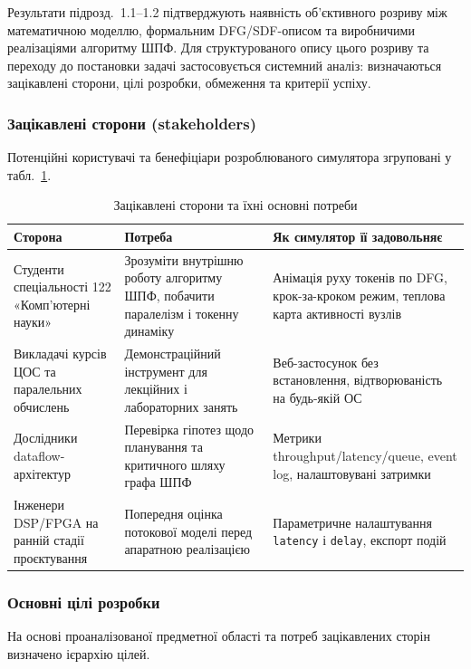 Результати підрозд.~1.1--1.2 підтверджують наявність об'єктивного
розриву між математичною моделлю, формальним DFG/SDF-описом та
виробничими реалізаціями алгоритму ШПФ. Для структурованого опису
цього розриву та переходу до постановки задачі застосовується
системний аналіз: визначаються зацікавлені сторони, цілі розробки,
обмеження та критерії успіху.

\subsubsection*{Зацікавлені сторони (stakeholders)}

Потенційні користувачі та бенефіціари розроблюваного симулятора
згруповані у табл.~\ref{tab:stakeholders}.

\begin{table}[H]
  \caption{Зацікавлені сторони та їхні основні потреби}
  \label{tab:stakeholders}
  \centering
  \small
  \begin{tabular}{p{3.4cm}p{5.0cm}p{5.0cm}}
    \toprule
    Сторона & Потреба & Як симулятор її задовольняє \\
    \midrule
    Студенти спеціальності 122 «Комп'ютерні науки» & Зрозуміти внутрішню роботу алгоритму ШПФ, побачити паралелізм і токенну динаміку & Анімація руху токенів по DFG, крок-за-кроком режим, теплова карта активності вузлів \\[2pt]
    Викладачі курсів ЦОС та паралельних обчислень & Демонстраційний інструмент для лекційних і лабораторних занять & Веб-застосунок без встановлення, відтворюваність на будь-якій ОС \\[2pt]
    Дослідники dataflow-архітектур & Перевірка гіпотез щодо планування та критичного шляху графа ШПФ & Метрики throughput/latency/queue, event log, налаштовувані затримки \\[2pt]
    Інженери DSP/FPGA на ранній стадії проєктування & Попередня оцінка потокової моделі перед апаратною реалізацією & Параметричне налаштування \texttt{latency} і \texttt{delay}, експорт подій \\
    \bottomrule
  \end{tabular}
\end{table}

\subsubsection*{Основні цілі розробки}

На основі проаналізованої предметної області та потреб
зацікавлених сторін визначено ієрархію цілей.

